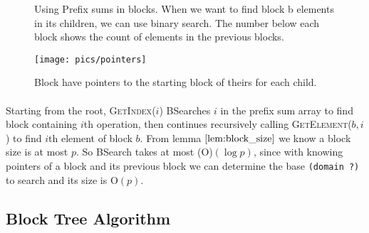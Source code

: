 \documentclass[10pt]{article}
\theoremstyle{definition}
\begin{document}
\begin{figure}
\begin{center}
\end{center}
\caption{\label{fig:prefix} Using Prefix sums in blocks. When we want to find block b elements in its children, we can use binary search. The number below each block shows the count of elements in the previous blocks.}
\end{figure}

\begin{figure}[hbt]
\centering
  \texttt{[image: pics/pointers]}
  \caption{Block have pointers to the starting block of theirs for each child. \label{fig::pointer}}
\end{figure}

\paragraph{}
Starting from the root, \textsc{GetIndex}($i$) BSearches $i$ in the prefix sum array to find block containing $i$th operation, then continues recursively calling \textsc{GetElement}($b,i$) to find $i$th element of block $b$. From lemma $\ref{lem:block_size}$ we know a block size is at most $p$. So BSearch takes at most \textsc(O)$(\log p)$, since  with knowing pointers of a block and its previous block we can determine the base \texttt{(domain ?)} to search and its size is \textsc{O}$(p)$.

\subsection{Block Tree Algorithm}
\end{document}
